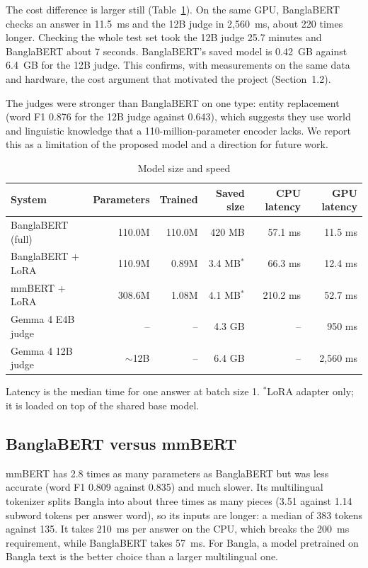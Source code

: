 The cost difference is larger still (Table~\ref{tab:efficiency}). On the same
GPU, BanglaBERT checks an answer in 11.5~ms and the 12B judge in 2,560~ms, about
220 times longer. Checking the whole test set took the 12B judge 25.7 minutes
and BanglaBERT about 7 seconds. BanglaBERT's saved model is 0.42~GB against
6.4~GB for the 12B judge. This confirms, with measurements on the same data and
hardware, the cost argument that motivated the project (Section~1.2).

The judges were stronger than BanglaBERT on one type: entity replacement
(word F1 0.876 for the 12B judge against 0.643), which suggests they use world
and linguistic knowledge that a 110-million-parameter encoder lacks. We report
this as a limitation of the proposed model and a direction for future work.

\begin{table}[htbp]
\centering
\small
\caption{Model size and speed}
\label{tab:efficiency}
\begin{tabular}{lrrrrr}
\hline
\textbf{System} & \textbf{Parameters} & \textbf{Trained} & \textbf{Saved size} & \textbf{CPU latency} & \textbf{GPU latency} \\
\hline
BanglaBERT (full) & 110.0M & 110.0M & 420 MB & 57.1 ms & 11.5 ms \\
BanglaBERT + LoRA & 110.9M & 0.89M & 3.4 MB$^{*}$ & 66.3 ms & 12.4 ms \\
mmBERT + LoRA & 308.6M & 1.08M & 4.1 MB$^{*}$ & 210.2 ms & 52.7 ms \\
Gemma 4 E4B judge & -- & -- & 4.3 GB & -- & 950 ms \\
Gemma 4 12B judge & $\sim$12B & -- & 6.4 GB & -- & 2,560 ms \\
\hline
\end{tabular}

\smallskip
\footnotesize Latency is the median time for one answer at batch size 1.
$^{*}$LoRA adapter only; it is loaded on top of the shared base model.
\end{table}

\subsection{BanglaBERT versus mmBERT}

mmBERT has 2.8 times as many parameters as BanglaBERT but was less accurate
(word F1 0.809 against 0.835) and much slower. Its multilingual tokenizer splits
Bangla into about three times as many pieces (3.51 against 1.14 subword tokens
per answer word), so its inputs are longer: a median of 383 tokens against 135.
It takes 210~ms per answer on the CPU, which breaks the 200~ms requirement,
while BanglaBERT takes 57~ms. For Bangla, a model pretrained on Bangla text is
the better choice than a larger multilingual one.

